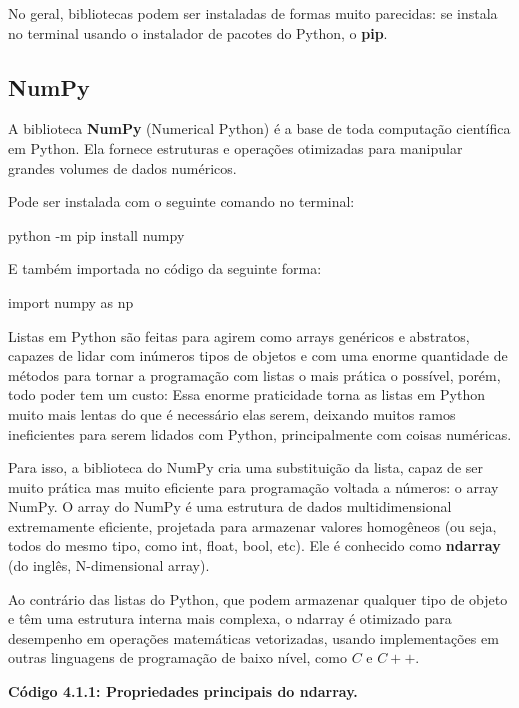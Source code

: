 \documentclass[11pt, a4paper]{article}
\begin{document}
No geral, bibliotecas podem ser instaladas de formas muito parecidas: se instala no terminal usando o instalador de pacotes do Python, o \textbf{pip}.

\void[-0.4]

\subsection{NumPy}

A biblioteca \textbf{NumPy} (Numerical Python) é a base de toda computação científica em Python. Ela fornece estruturas e operações otimizadas para manipular grandes volumes de dados numéricos.

Pode ser instalada com o seguinte comando no terminal:
\begin{code}
python -m pip install numpy
\end{code}

\void[-0.5]

E também importada no código da seguinte forma:

\begin{code}
import numpy as np
\end{code}

\void[-0.5]

Listas em Python são feitas para agirem como arrays genéricos e abstratos, capazes de lidar com inúmeros tipos de objetos e com uma enorme quantidade de métodos para tornar a programação com listas o mais prática o possível, porém, todo poder tem um custo: Essa enorme praticidade torna as listas em Python muito mais lentas do que é necessário elas serem, deixando muitos ramos ineficientes para serem lidados com Python, principalmente com coisas numéricas.

Para isso, a biblioteca do NumPy cria uma substituição da lista, capaz de ser muito prática mas muito eficiente para programação voltada a números: o array NumPy. O array do NumPy é uma estrutura de dados multidimensional extremamente eficiente, projetada para armazenar valores homogêneos (ou seja, todos do mesmo tipo, como int, float, bool, etc). Ele é conhecido como \textbf{ndarray} (do inglês, N-dimensional array).

Ao contrário das listas do Python, que podem armazenar qualquer tipo de objeto e têm uma estrutura interna mais complexa, o ndarray é otimizado para desempenho em operações matemáticas vetorizadas, usando implementações em outras linguagens de programação de baixo nível, como \(C\) e \(C++\).

\textbf{Código 4.1.1: Propriedades principais do ndarray.}
\end{document}
